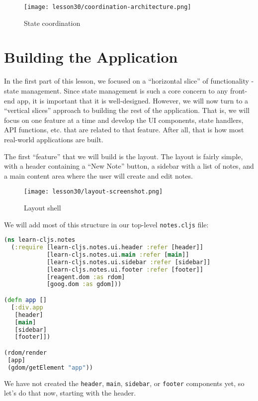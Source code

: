 \documentclass[10pt,twoside,openright]{memoir}
\begin{document}
\begin{figure}[H]
\caption{State coordination}
\centering
\texttt{[image: lesson30/coordination-architecture.png]}
\end{figure}


\section{Building the Application}

In the first part of this lesson, we focused on a ``horizontal slice''
of functionality - state management. Since state management is such a
core concern to any front-end app, it is important that it is
well-designed. However, we will now turn to a ``vertical slices''
approach to building the rest of the application. That is, we will focus
on one feature at a time and develop the UI components, state handlers,
API functions, etc. that are related to that feature. After all, that is
how most real-world applications are built.

The first ``feature'' that we will build is the layout. The layout is
fairly simple, with a header containing a ``New Note'' button, a sidebar
with a list of notes, and a main content area where the user will create
and edit notes.

\begin{figure}[H]
\caption{Layout shell}
\centering
\texttt{[image: lesson30/layout-screenshot.png]}
\end{figure}

We will add most of this structure in our top-level \texttt{notes.cljs}
file:

\begin{lstlisting}[language=Clojure, caption={notes.cljs}]
(ns learn-cljs.notes
  (:require [learn-cljs.notes.ui.header :refer [header]]
            [learn-cljs.notes.ui.main :refer [main]]
            [learn-cljs.notes.ui.sidebar :refer [sidebar]]
            [learn-cljs.notes.ui.footer :refer [footer]]
            [reagent.dom :as rdom]
            [goog.dom :as gdom]))

(defn app []
  [:div.app
   [header]
   [main]
   [sidebar]
   [footer]])

(rdom/render
 [app]
 (gdom/getElement "app"))
\end{lstlisting}

We have not created the \texttt{header}, \texttt{main},
\texttt{sidebar}, or \texttt{footer} components yet, so let's do that
now, starting with the header.
\end{document}
